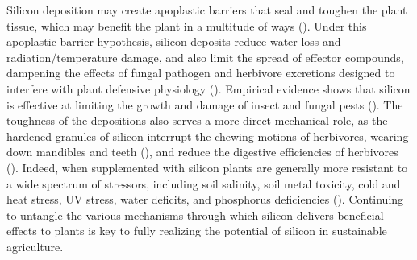 \documentclass[12pt, letterpaper, ]{report}
\begin{document}
Silicon deposition may create apoplastic barriers that seal and toughen the plant tissue, which may benefit the plant in a multitude of ways (\cite{coskun_controversies_2019}). Under this apoplastic barrier hypothesis, silicon deposits reduce water loss and radiation/temperature damage, and also limit the spread of effector compounds, dampening the effects of fungal pathogen and herbivore excretions designed to interfere with plant defensive physiology (\cite{coskun_controversies_2019}). Empirical evidence shows that silicon is effective at limiting the growth and damage of insect and fungal pests (\cite{fauteux_silicon_2005,massey_herbivore_2007}). The toughness of the depositions also serves a more direct mechanical role, as the hardened granules of silicon interrupt the chewing motions of herbivores, wearing down mandibles and teeth (\cite{stromberg_functions_2016,waterman_short-term_2021-1}), and reduce the digestive efficiencies of herbivores (\cite{johnson_silicon_2021}). Indeed, when supplemented with silicon plants are generally more resistant to a wide spectrum of stressors, including soil salinity, soil metal toxicity, cold and heat stress, UV stress, water deficits, and phosphorus deficiencies (\cite{cooke_consistent_2016}). Continuing to untangle the various mechanisms through which silicon delivers beneficial effects to plants is key to fully realizing the potential of silicon in sustainable agriculture.
\end{document}
